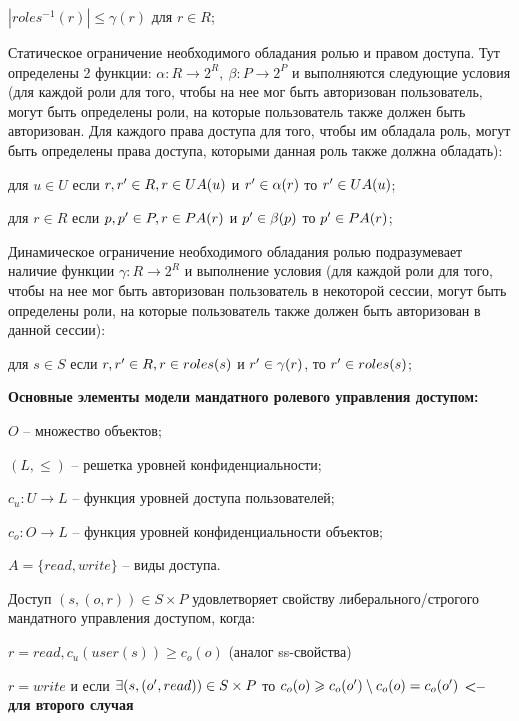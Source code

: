 \begin{enumerate*}
\begin{itemize*}
			\item $|roles^{-1}(r)| \leqslant \gamma(r)$ для $r \in R$;
		\end{itemize*}
	\item Статическое ограничение необходимого обладания ролью и правом доступа. Тут определены 2 функции: $\alpha: R \to 2^R, \ \beta:P \to 2^P$ и выполняются следующие условия (для каждой роли для того, чтобы на нее мог 
	быть авторизован пользователь, могут быть определены роли, на которые пользователь также должен быть авторизован. Для каждого права доступа для того, чтобы им обладала роль, могут быть определены права доступа, 
	которыми данная роль также должна обладать):
		\begin{itemize*}
			\item для $u \in U$ если $r, r^{\prime} \in R, r \in UA(u)$ и $r^{\prime} \in \alpha(r)$ то $r^{\prime} \in UA(u)$;
			\item для $r \in R$ если $p, p^{\prime} \in P, r \in PA(r)$ и $p^{\prime} \in \beta(p)$ то $p^{\prime} \in PA(r)$;
		\end{itemize*}
	\item Динамическое ограничение необходимого обладания ролью подразумевает наличие функции $\gamma:R \to 2^R$ и выполнение условия (для каждой роли для того, чтобы на нее мог быть авторизован пользователь
	в некоторой сессии, могут быть определены роли, на которые пользователь также должен быть авторизован в данной сессии):
		\begin{itemize*}
			\item для $s \in S$ если $r, r^{\prime} \in R, r \in roles(s)$ и $r^{\prime} \in \gamma(r)$, то $r^{\prime} \in roles(s)$;
		\end{itemize*}
\end{enumerate*}

\textbf{Основные элементы модели мандатного ролевого управления доступом:}
\begin{enumerate*}
	\item $O$ -- множество объектов;
	\item $(L, \leqslant)$ -- решетка уровней конфиденциальности;
	\item $c_u: U \to L$ -- функция уровней доступа пользователей;
	\item $c_o: O \to L$ -- функция уровней конфиденциальности объектов;
	\item $A = \{read, write\}$ -- виды доступа.
\end{enumerate*}

\begin{defs}
	Доступ $(s, (o,r)) \in S \times P$ удовлетворяет свойству либерального/строгого мандатного управления доступом, когда:
		\begin{itemize*}
			\item $r = read, c_u(user(s)) \geqslant c_o(o)$ (аналог ss-свойства)
			\item $r = write$ и если $\exists (s, (o^{\prime}, read)) \in S \times P$ то $c_o(o) \geqslant c_o(o^{\prime})  \setminus c_o(o) = c_o(o^{\prime})$ \textbf{<-- для второго случая}
		\end{itemize*}
\end{defs}

